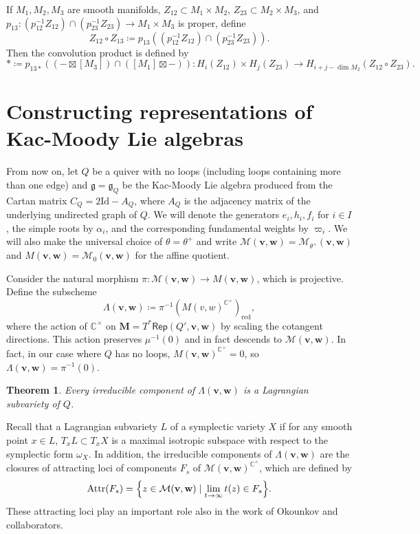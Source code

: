 \documentclass{amsart}
\newtheorem{thm}{Theorem}[section]
\theoremstyle{definition}
\theoremstyle{remark}
\theoremstyle{plain}
\theoremstyle{definition}
\theoremstyle{remark}
\newcommand{\C}{\mathbb{C}}
\newcommand{\mc}[1]{\mathcal{#1}}
\newcommand{\mf}[1]{\mathfrak{#1}}
\newcommand{\mbf}[1]{\mathbf{#1}}
\newcommand{\mr}[1]{\mathrm{#1}}
\newcommand{\ms}[1]{\mathsf{#1}}
\newcommand{\1}{\mathbf{1}}
\newcommand{\2}{\mathbf{2}}
\newcommand{\3}{\mathbf{3}}
\renewcommand{\v}{\mbf{v}}
\newcommand{\w}{\mbf{w}}
\begin{document}
If $M_1, M_2, M_3$ are smooth manifolds, $Z_{12} \subset M_1 \times M_2$, $Z_{23} \subset M_{2} \times M_3$, and $p_{13} \colon (p_{12}^{-1} Z_{12}) \cap (p_{23}^{-1} Z_{23}) \to M_1 \times M_3$ is proper, define
\[ Z_{12} \circ Z_{13} \coloneqq p_{13} ((p_{12}^{-1} Z_{12}) \cap (p_{23}^{-1} Z_{23})). \]
Then the convolution product is defined by
\[ * \coloneqq p_{13*} ((- \boxtimes [M_3]) \cap ([M_1] \boxtimes -)) \colon H_i(Z_{12}) \times H_j(Z_{23}) \to H_{i+j-\dim M_2}(Z_{12} \circ Z_{23}). \]

\section{Constructing representations of Kac-Moody Lie algebras}

From now on, let $Q$ be a quiver with no loops (including loops containing more than one edge) and $\mf{g} = \mf{g}_Q$ be the Kac-Moody Lie algebra produced from the Cartan matrix $C_Q = 2 \mr{Id} - A_Q$, where $A_Q$ is the adjacency matrix of the underlying undirected graph of $Q$. We will denote the generators $e_i, h_i, f_i$ for $i \in I$, the simple roots by $\alpha_i$, and the corresponding fundamental weights by $\varpi_i$. We will also make the universal choice of $\theta = \theta^+$ and write $\mc{M}(\mbf{v}, \mbf{w}) = \mc{M}_{\theta^+}(\mbf{v}, \mbf{w})$ and $M(\mbf{v}, \mbf{w}) = \mc{M}_0(\mbf{v}, \mbf{w})$ for the affine quotient.

Consider the natural morphism $\pi \colon \mc{M}(\v, \w) \to M(\v, \w)$, which is projective. Define the subscheme
\[ \Lambda(\v, \w) \coloneqq \pi^{-1}(M(v, w)^{\C^{\times}})_{\mr{red}}, \]
where the action of $\C^{\times}$ on $\mbf{M} = T^* \ms{Rep}(Q', \v, \w)$ by scaling the cotangent directions. This action preserves $\mu^{-1}(0)$ and in fact descends to $\mc{M}(\v, \w)$. In fact, in our case where $Q$ has no loops, $M(\v, \w)^{\C^{\times}} = \qty{0}$, so $\Lambda(\v, \w) = \pi^{-1}(0)$.

\begin{thm}
    Every irreducible component of $\Lambda(\v, \w)$ is a Lagrangian subvariety of $Q$.
\end{thm}

Recall that a Lagrangian subvariety $L$ of a symplectic variety $X$ if for any smooth point $x \in L$, $T_x L \subset T_x X$ is a maximal isotropic subspace with respect to the symplectic form $\omega_X$. In addition, the irreducible components of $\Lambda(\v, \w)$ are the closures of attracting loci of components $F_s$ of $\mc{M}(\v, \w)^{\C^{\times}}$, which are defined by
\[ \mr{Attr}(F_s) = \qty{z \in \mc{M}(\v, \w) \mid \lim_{t \to \infty} t(z) \in F_s}. \]
These attracting loci play an important role also in the work of Okounkov and collaborators.
\end{document}
